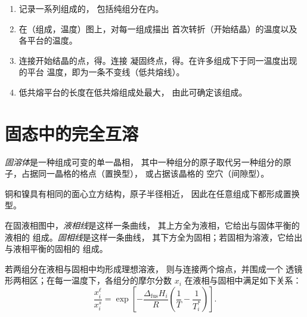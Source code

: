 \begin{method}[由冷却曲线绘制相图]\label{met:b2:solid-liquid-diagrams:diagram-from-curves}
\begin{enumerate}
  \item 记录一系列组成的，
        包括纯组分在内。
  \item 在（组成，温度）图上，对每一组成描出
        首次转折（开始结晶）的温度以及
        各平台的温度。
  \item 连接开始结晶的点，得。连接
        凝固终点，得。在许多组成下于同一温度出现的平台
        温度，即为一条不变线（低共熔线）。
  \item 低共熔平台的长度在低共熔组成处最大，
        由此可确定该组成。
\end{enumerate}
\end{method}

\section{固态中的完全互溶}

\begin{definition}[固溶体]\label{def:b2:solid-liquid-diagrams:solid-solution}
\emph{固溶体}是一种组成可变的单一晶相，
其中一种组分的原子取代另一种组分的原子，占据同一晶格的格点（置换型），
或占据该晶格的
空穴（间隙型）。
\end{definition}

铜和镍具有相同的面心立方结构，原子半径相近，
因此在任意组成下都形成置换型。

\begin{definition}[液相线与固相线]\label{def:b2:solid-liquid-diagrams:liquidus}
在固液相图中，\emph{液相线}是这样一条曲线，
其上方全为液相，它给出与固体平衡的液相的
组成。\emph{固相线}是这样一条曲线，
其下方全为固相；若固相为溶液，它给出与液相平衡的固相的
组成。
\end{definition}

\begin{proposition}[透镜]\label{prop:b2:solid-liquid-diagrams:lens}
若两组分在液相与固相中均形成理想溶液，
则与连接两个熔点，并围成一个
透镜形两相区；在每一温度下，各组分的摩尔分数 $x_i$
在液相与固相中满足如下关系：
\[
  \frac{x_i^{\ell}}{x_i^{s}} = \exp\left[-\frac{\Delta_{\text{fus}}H_i}{R}\left(\frac1T - \frac1{T_i^*}\right)\right] .
\]
\end{proposition}

